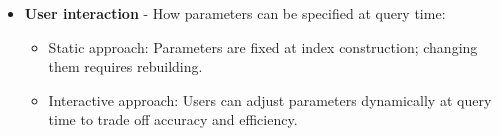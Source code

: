 \begin{itemize}
    \item \textbf{User interaction} - How parameters can be specified at query time:
    \begin{itemize}
        \item Static approach: Parameters are fixed at index construction; changing them requires rebuilding.
        \item Interactive approach: Users can adjust parameters dynamically at query time to trade off accuracy and efficiency.
    \end{itemize}
\end{itemize}